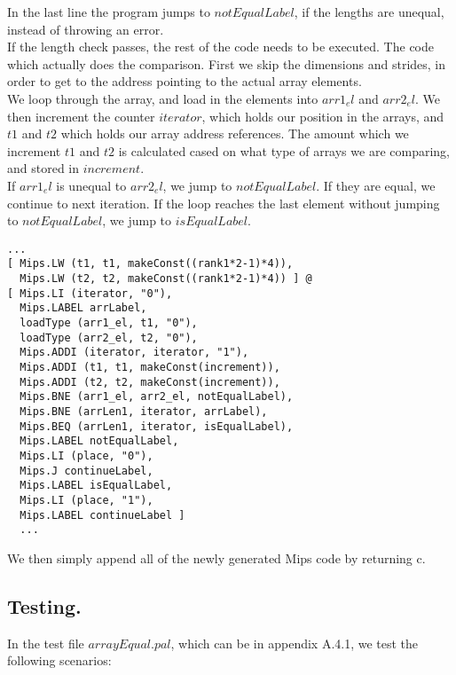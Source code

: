 \documentclass[12pt]{article}
\begin{document}
In the last line the program jumps to $notEqualLabel$, if the lengths are unequal, instead of throwing an error.\\
If the length check passes, the rest of the code needs to be executed. The code which actually does the comparison. First we skip the dimensions and strides, in order to get to the address pointing to the actual array elements. \\

We loop through the array, and load in the elements into $arr1_el$ and $arr2_el$. 
We then increment the counter $iterator$, which holds our position in the arrays, and $t1$ and $t2$ which holds our array address references. The amount which we increment $t1$ and $t2$ is calculated cased on what type of arrays we are comparing, and stored in $increment$. \\

If $arr1_el$ is unequal to $arr2_el$, we jump to $notEqualLabel$. If they are equal, we continue to next iteration. If the loop reaches the last element without jumping to $notEqualLabel$, we jump to $isEqualLabel$.

\pagebreak

\begin{lstlisting}[caption=Compiler.sml calculate whether arrays are equal in equal operation.]
  ...
[ Mips.LW (t1, t1, makeConst((rank1*2-1)*4)),
  Mips.LW (t2, t2, makeConst((rank1*2-1)*4)) ] @
[ Mips.LI (iterator, "0"),
  Mips.LABEL arrLabel,
  loadType (arr1_el, t1, "0"),
  loadType (arr2_el, t2, "0"),
  Mips.ADDI (iterator, iterator, "1"),
  Mips.ADDI (t1, t1, makeConst(increment)),
  Mips.ADDI (t2, t2, makeConst(increment)),
  Mips.BNE (arr1_el, arr2_el, notEqualLabel),
  Mips.BNE (arrLen1, iterator, arrLabel),
  Mips.BEQ (arrLen1, iterator, isEqualLabel),
  Mips.LABEL notEqualLabel,
  Mips.LI (place, "0"),
  Mips.J continueLabel,
  Mips.LABEL isEqualLabel,
  Mips.LI (place, "1"),
  Mips.LABEL continueLabel ]
  ...
\end{lstlisting}

\noindent We then simply append all of the newly generated Mips code by returning c.

\pagebreak

\subsection{Testing.}

In the test file $arrayEqual.pal$, which can be in appendix A.4.1, we test the following scenarios:
\end{document}
